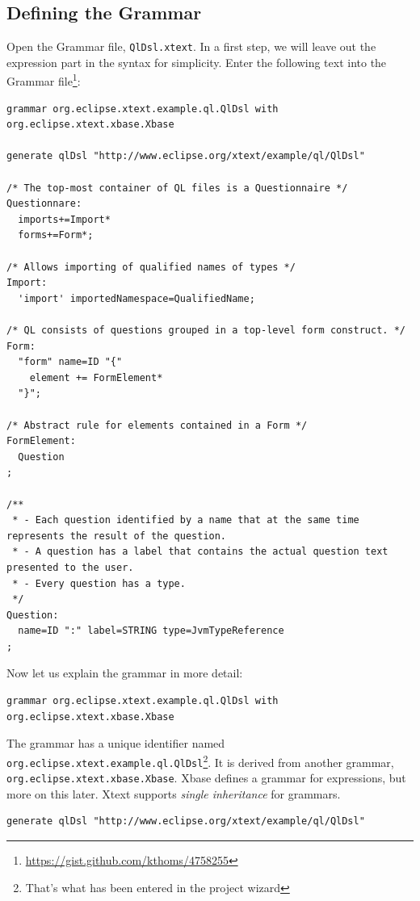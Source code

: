 \subsection{Defining the Grammar}

Open the Grammar file, \texttt{QlDsl.xtext}. In a first step, we will leave out
the expression part in the syntax for simplicity. Enter the following text into
the Grammar file\footnote{\url{https://gist.github.com/kthoms/4758255}}:

\begin{lstlisting}[language=Xtext]
grammar org.eclipse.xtext.example.ql.QlDsl with org.eclipse.xtext.xbase.Xbase

generate qlDsl "http://www.eclipse.org/xtext/example/ql/QlDsl"

/* The top-most container of QL files is a Questionnaire */
Questionnare:
  imports+=Import*
  forms+=Form*;

/* Allows importing of qualified names of types */
Import:
  'import' importedNamespace=QualifiedName;

/* QL consists of questions grouped in a top-level form construct. */
Form:
  "form" name=ID "{"
    element += FormElement*
  "}";

/* Abstract rule for elements contained in a Form */
FormElement:
  Question
;

/**
 * - Each question identified by a name that at the same time represents the result of the question.
 * - A question has a label that contains the actual question text presented to the user.
 * - Every question has a type.
 */
Question:
  name=ID ":" label=STRING type=JvmTypeReference
;
\end{lstlisting}

Now let us explain the grammar in more detail:

\begin{lstlisting}[language=Xtext]
grammar org.eclipse.xtext.example.ql.QlDsl with org.eclipse.xtext.xbase.Xbase
\end{lstlisting}

The grammar has a unique identifier named
\texttt{org.eclipse.xtext.example.ql.QlDsl}\footnote{That's what has been
entered in the project wizard}. It is derived from another grammar,
\texttt{org.eclipse.xtext.xbase.Xbase}. Xbase defines a grammar for expressions,
but more on this later. Xtext supports \emph{single inheritance} for grammars.

\begin{lstlisting}[language=Xtext]
generate qlDsl "http://www.eclipse.org/xtext/example/ql/QlDsl"
\end{lstlisting}

